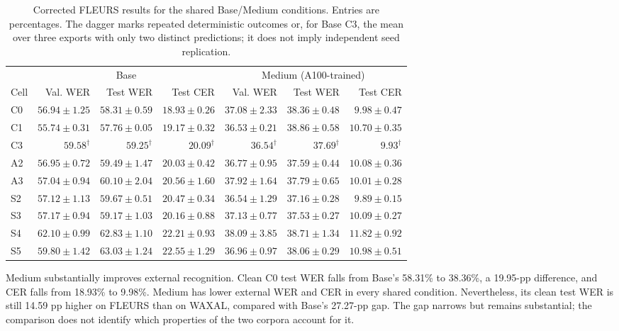 \documentclass[12pt,a4paper]{report}
\begin{document}
\begin{table}[htbp]\centering\scriptsize
\caption{Corrected FLEURS results for the shared Base/Medium conditions.
Entries are percentages. The dagger marks repeated deterministic outcomes
or, for Base C3, the mean over three exports with only two distinct predictions;
it does not imply independent seed replication.}
\label{tab:fleurs}
\setlength{\tabcolsep}{3pt}
\begin{tabular}{lrrrrrr}\toprule
 & \multicolumn{3}{c}{Base} & \multicolumn{3}{c}{Medium (A100-trained)}\\
Cell & Val. WER & Test WER & Test CER & Val. WER & Test WER & Test CER\\\midrule
C0 & $56.94 \pm 1.25$ & $58.31 \pm 0.59$ & $18.93 \pm 0.26$ & $37.08 \pm 2.33$ & $38.36 \pm 0.48$ & $9.98 \pm 0.47$ \\
C1 & $55.74 \pm 0.31$ & $57.76 \pm 0.05$ & $19.17 \pm 0.32$ & $36.53 \pm 0.21$ & $38.86 \pm 0.58$ & $10.70 \pm 0.35$ \\
C3 & $59.58^{\dagger}$ & $59.25^{\dagger}$ & $20.09^{\dagger}$ & $36.54^{\dagger}$ & $37.69^{\dagger}$ & $9.93^{\dagger}$ \\
A2 & $56.95 \pm 0.72$ & $59.49 \pm 1.47$ & $20.03 \pm 0.42$ & $36.77 \pm 0.95$ & $37.59 \pm 0.44$ & $10.08 \pm 0.36$ \\
A3 & $57.04 \pm 0.94$ & $60.10 \pm 2.04$ & $20.56 \pm 1.60$ & $37.92 \pm 1.64$ & $37.79 \pm 0.65$ & $10.01 \pm 0.28$ \\
S2 & $57.12 \pm 1.13$ & $59.67 \pm 0.51$ & $20.47 \pm 0.34$ & $36.54 \pm 1.29$ & $37.16 \pm 0.28$ & $9.89 \pm 0.15$ \\
S3 & $57.17 \pm 0.94$ & $59.17 \pm 1.03$ & $20.16 \pm 0.88$ & $37.13 \pm 0.77$ & $37.53 \pm 0.27$ & $10.09 \pm 0.27$ \\
S4 & $62.10 \pm 0.99$ & $62.83 \pm 1.10$ & $22.21 \pm 0.93$ & $38.09 \pm 3.85$ & $38.71 \pm 1.34$ & $11.82 \pm 0.92$ \\
S5 & $59.80 \pm 1.42$ & $63.03 \pm 1.24$ & $22.55 \pm 1.29$ & $36.96 \pm 0.97$ & $38.06 \pm 0.29$ & $10.98 \pm 0.51$ \\
\bottomrule\end{tabular}\end{table}

Medium substantially improves external recognition. Clean C0 test WER falls
from Base's 58.31\% to 38.36\%, a 19.95-pp difference, and CER falls from
18.93\% to 9.98\%. Medium has lower external WER and CER in every shared
condition. Nevertheless, its clean test WER is still 14.59 pp higher on
FLEURS than on WAXAL, compared with Base's 27.27-pp gap. The gap narrows
but remains substantial; the comparison does not identify which properties
of the two corpora account for it.
\end{document}
